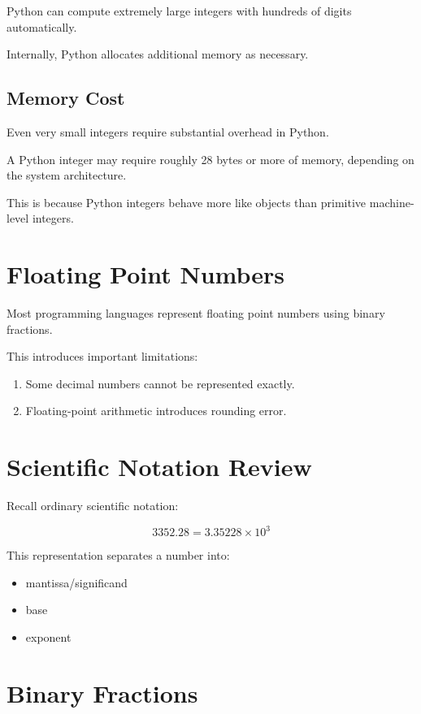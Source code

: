 \documentclass[11pt]{article}
\begin{document}
Python can compute extremely large integers with hundreds of digits automatically.

Internally, Python allocates additional memory as necessary.

\subsection{Memory Cost}

Even very small integers require substantial overhead in Python.

A Python integer may require roughly 28 bytes or more of memory, depending on the system architecture.

This is because Python integers behave more like objects than primitive machine-level integers.

\section{Floating Point Numbers}

Most programming languages represent floating point numbers using binary fractions.

This introduces important limitations:

\begin{enumerate}[label=(\alph*)]
    \item Some decimal numbers cannot be represented exactly.
    \item Floating-point arithmetic introduces rounding error.
\end{enumerate}

\section{Scientific Notation Review}

Recall ordinary scientific notation:

\[
3352.28 = 3.35228 \times 10^3
\]

This representation separates a number into:

\begin{itemize}
    \item mantissa/significand
    \item base
    \item exponent
\end{itemize}

\section{Binary Fractions}
\end{document}
